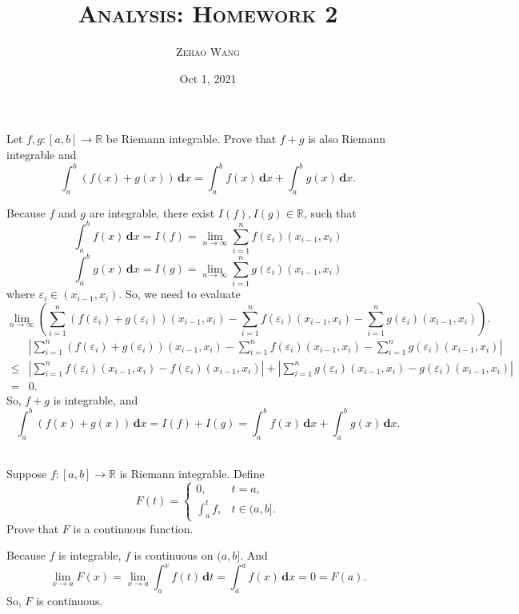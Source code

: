 \documentclass[en, normal, 11pt, black]{elegantnote}
\title{\textsc{Analysis: Homework 2}}
\author{\textsc{Zehao Wang}}
\date{Oct 1, 2021}
\newenvironment{exercise}[1]{\begin{tcolorbox}[colback=black!15, colframe=black!80, breakable, title=#1]}{\end{tcolorbox}}
\renewenvironment{proof}{\begin{tcolorbox}[colback=white, colframe=black!50, breakable, title=Proof. ]\setlength{\parskip}{0.8em}}{\,\\\rightline{$\square$}\end{tcolorbox}}
\newcommand{\der}{\,\mathbf{d}}
\begin{document}
\maketitle

\begin{exercise}{(1), }
    Let $f, g:[a, b] \rightarrow \mathbb{R}$ be Riemann integrable. Prove that $f+g$ is also Riemann integrable and
    \[
        \int_{a}^{b}(f(x)+g(x))\der x=\int_{a}^{b} f(x)\der x+\int_{a}^{b} g(x)\der x. 
    \]
\end{exercise}
\begin{proof}
    Because $f$ and $g$ are integrable, there exist $I(f), I(g)\in\mathbb{R}$, such that
    \[
        \int_{a}^{b} f(x)\der x=I(f)=\lim_{n\to\infty}\sum_{i=1}^{n}f(\varepsilon_i)(x_{i-1}, x_i)
    \]
    \[
        \int_{a}^{b} g(x)\der x=I(g)=\lim_{n\to\infty}\sum_{i=1}^{n}g(\varepsilon_i)(x_{i-1}, x_i)
    \]
    where $\varepsilon_i\in(x_{i-1}, x_i)$. So, we need to evaluate 
    \[
        \lim_{n\to\infty}\left(\sum_{i=1}^{n}\left(f(\varepsilon_i)+g(\varepsilon_i)\right)(x_{i-1}, x_i)-\sum_{i=1}^{n}f(\varepsilon_i)(x_{i-1}, x_i)-\sum_{i=1}^{n}g(\varepsilon_i)(x_{i-1}, x_i)\right). 
    \]
    \begin{align*}
        &\left|\sum_{i=1}^{n}\left(f(\varepsilon_i)+g(\varepsilon_i)\right)(x_{i-1}, x_i)-\sum_{i=1}^{n}f(\varepsilon_i)(x_{i-1}, x_i)-\sum_{i=1}^{n}g(\varepsilon_i)(x_{i-1}, x_i)\right|\\
        \leqslant&\left|\sum_{i=1}^{n}f(\varepsilon_i)(x_{i-1}, x_i)-f(\varepsilon_i)(x_{i-1}, x_i)\right|+\left|\sum_{i=1}^{n}g(\varepsilon_i)(x_{i-1}, x_i)-g(\varepsilon_i)(x_{i-1}, x_i)\right|\\
        =&0. 
    \end{align*}
    So, $f+g$ is integrable, and
    \[
        \int_{a}^{b}(f(x)+g(x))\der x=I(f)+I(g)=\int_{a}^{b} f(x)\der x+\int_{a}^{b} g(x)\der x. 
    \]
    \vspace{-30pt}
\end{proof}

\begin{exercise}{(2), }
    Suppose $f:[a, b] \rightarrow \mathbb{R}$ is Riemann integrable. Define 
    \[
        F(t)= \begin{cases}0, & t=a, \\ \int_{a}^{t} f, & t \in(a, b]. \end{cases}
    \]
    Prove that $F$ is a continuous function. 
\end{exercise}
\begin{proof}
    Because $f$ is integrable, $f$ is continuous on $(a,b]$. And
    \[\lim_{x\to a}F(x)=\lim_{x\to a}\int_{a}^{x}f(t)\der t=\int_a^af(x)\der x=0=F(a). \]
    So, $F$ is continuous. 
\end{proof}
\end{document}
